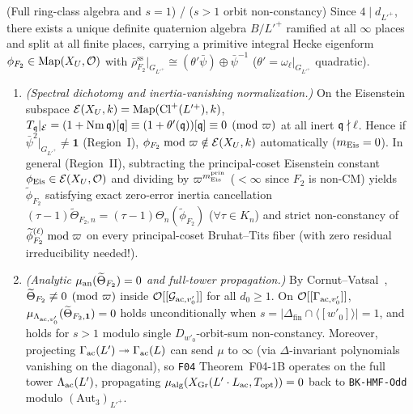 \begin{theorem}[Definite-Quaternion Eisenstein Spectral Dichotomy and $\mu_{\an}^{\mathrm{opt}} = 0$~\texttt{H08-1}]\label{thm:5:quat-mu}
\tagProved{} \textup{(Full ring-class algebra and $s=1$)} / \tagMod{} \textup{($s > 1$ orbit non-constancy)}
Since $4 \mid d_{L'^+}$, there exists a unique definite quaternion algebra $B/L'^+$ ramified at all $\infty$ places and split at all finite places, carrying a primitive integral Hecke eigenform $\phi_{F_2} \in \mathrm{Map}(X_U, \mathcal{O})$ with $\bar\rho_{F_2}^{\mathrm{ss}}|_{G_{L'^+}} \cong (\theta' \bar\psi) \oplus \bar\psi^{-1}$ ($\theta' = \omega_\ell|_{G_{L'^+}}$ quadratic).
\begin{enumerate}[label=\textup{(\roman*)}]
\item \emph{(Spectral dichotomy and inertia-vanishing normalization.)} On the Eisenstein subspace $\mathcal{E}(X_U, k) = \mathrm{Map}(\mathrm{Cl}^+(L'^+), k)$, $T_{\mathfrak{q}}|_{\mathcal{E}} = (1 + \operatorname{Nm}\mathfrak{q})[\mathfrak{q}] \equiv (1 + \theta'(\mathfrak{q}))[\mathfrak{q}] \equiv 0 \pmod{\varpi}$ at all inert $\mathfrak{q} \nmid \ell$. Hence if $\bar\psi^2|_{G_{L'^+}} \neq \mathbf{1}$ (Region~I), $\phi_{F_2} \bmod \varpi \notin \mathcal{E}(X_U, k)$ automatically ($m_{\mathrm{Eis}} = 0$). In general (Region~II), subtracting the principal-coset Eisenstein constant $\phi_{\mathrm{Eis}} \in \mathcal{E}(X_U, \mathcal{O})$ and dividing by $\varpi^{m_{\mathrm{Eis}}^{\mathrm{prin}}}$ ($< \infty$ since $F_2$ is non-CM) yields $\widetilde{\phi}_{F_2}$ satisfying exact zero-error inertia cancellation $(\tau-1)\widetilde{\Theta}_{F_2, n} = (\tau-1)\Theta_n(\widetilde{\phi}_{F_2})$ ($\forall \tau \in K_n$) and strict non-constancy of $\widetilde{\phi}_{F_2}^{(\ell)} \bmod \varpi$ on every principal-coset Bruhat--Tits fiber (with zero residual irreducibility needed!).
\item \emph{(Analytic $\mu_{\mathrm{an}}(\widetilde{\Theta}_{F_2}) = 0$ and full-tower propagation.)} By Cornut--Vatsal~\cite{CV2007}, $\widetilde{\Theta}_{F_2} \not\equiv 0 \pmod{\varpi}$ inside $\mathcal{O}[[\mathcal{G}_{\mathrm{ac}, v'_0}]]$ for all $d_0 \ge 1$. On $\mathcal{O}[[\Gamma_{\mathrm{ac}, v'_0}]]$, $\mu_{\Lambda_{\mathrm{ac}, v'_0}}(\widetilde{\Theta}_{F_2, \mathbf{1}}) = 0$ holds unconditionally when $s = |\Delta_{\mathrm{fin}} \cap \langle [w'_0]\rangle| = 1$, and holds for $s > 1$ modulo single $D_{w'_0}$-orbit-sum non-constancy. Moreover, projecting $\Gamma_{\mathrm{ac}}(L') \twoheadrightarrow \Gamma_{\mathrm{ac}}(L)$ can send $\mu$ to $\infty$ (via $\Delta$-invariant polynomials vanishing on the diagonal), so \texttt{F04} Theorem~F04-1B operates on the full tower $\Lambda_{\mathrm{ac}}(L')$, propagating $\mu_{\mathrm{alg}}(X_{\mathrm{Gr}}(L'\cdot L_{\mathrm{ac}}, T_{\mathrm{opt}})) = 0$ back to \texttt{BK-HMF-Odd} modulo $(\mathrm{Aut}_3)_{L'^+}$.
\end{enumerate}
\end{theorem}

